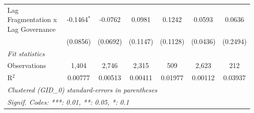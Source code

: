 \begin{table}[htbp]
\begin{tabular}{lcccccc}
      Lag Fragmentation x Lag Governance & -0.1464$^{*}$ & -0.0762       & 0.0981       & 0.1242        & 0.0593   & 0.0636\\   
                                         & (0.0856)      & (0.0692)      & (0.1147)     & (0.1128)      & (0.0436) & (0.2494)\\   
      \midrule
      \emph{Fit statistics}\\
      Observations                       & 1,404         & 2,746         & 2,315        & 509           & 2,623    & 212\\  
      R$^2$                              & 0.00777       & 0.00513       & 0.00411      & 0.01977       & 0.00112  & 0.03937\\  
      \midrule \midrule
      \multicolumn{7}{l}{\emph{Clustered (GID\_0) standard-errors in parentheses}}\\
      \multicolumn{7}{l}{\emph{Signif. Codes: ***: 0.01, **: 0.05, *: 0.1}}\\
   \end{tabular}
\end{table}



